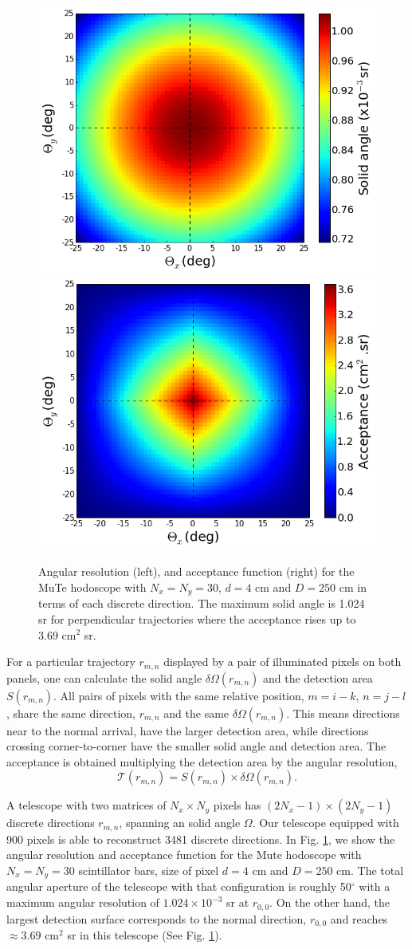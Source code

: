 \documentclass[letterpaper,11pt]{article}
\begin{document}
\begin{figure}[htb]
\centering
\includegraphics[width=0.48\columnwidth]{Figures/Solid_angle.png}
\includegraphics[width=0.48\columnwidth]{Figures/Aceptancia.png}
\caption{Angular resolution (left), and acceptance function (right) for the MuTe hodoscope with $N_x=N_y=30$, $d=4$ cm and $D=250$ cm in terms of each discrete direction. The maximum solid angle is 1.024 sr for perpendicular trajectories where the acceptance rises up to 3.69 cm$^{2}$ sr.}
\label{fig:acceptance}
\end{figure}


For a particular trajectory $r_{m,n}$ displayed by a pair of illuminated pixels on both panels, one can calculate the solid angle $\delta\Omega(r_{m,n})$ and the detection area $S(r_{m,n})$. All pairs of pixels with the same relative position, {$m=i-k$, $n=j-l$}, share the same direction, $r_{m,n}$ and the same $\delta\Omega(r_{m,n})$. This means directions near to the normal arrival, have the larger detection area, while directions crossing corner-to-corner have the smaller solid angle and detection area. The acceptance is obtained \cite{LesparreEtal2010} multiplying the detection area by the angular resolution,
\begin{equation}
\mathcal{T}(r_{m,n})=S(r_{m,n})\times \delta\Omega(r_{m,n}).
\end{equation}

A telescope with two matrices of $N_x\times N_y$ pixels has $(2N_x-1)\times(2N_y-1)$ discrete directions $r_{m,n}$, spanning an solid angle $\Omega$. Our telescope equipped with 900 pixels is able to reconstruct 3481 discrete directions. In Fig. \ref{fig:acceptance}, we show the angular resolution and acceptance function for the Mute hodoscope with $N_x=N_y=30$ scintillator bars, size of pixel $d=4$ cm and $D=250$ cm. The total angular aperture of the telescope with that configuration is roughly 50$^{\circ}$ with a maximum angular resolution of $1.024\times 10^{-3}$ sr at $r_{0,0}$. On the other hand, the largest detection surface corresponds to the normal direction, $r_{0,0}$ and reaches $\approx 3.69$ cm$^{2}$ sr in this telescope (See Fig. \ref{fig:acceptance}).
\end{document}
